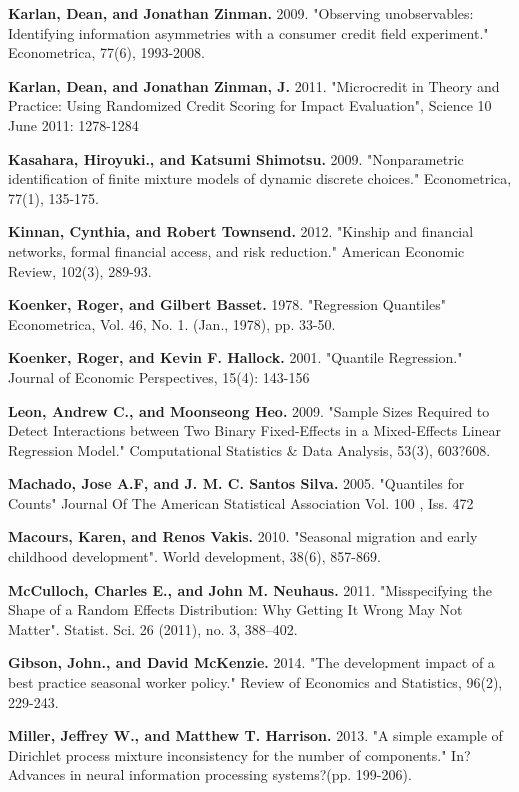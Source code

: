 \documentclass[AER]{AEA}
\begin{document}
\begin{thebibliography}{99}
 \textbf{ Karlan, Dean, and Jonathan Zinman.} 2009. "Observing unobservables: Identifying information asymmetries with a consumer credit field experiment." Econometrica, 77(6), 1993-2008.

  \textbf{ Karlan, Dean, and Jonathan Zinman, J.} 2011. "Microcredit in Theory and Practice: Using Randomized Credit Scoring for Impact Evaluation", Science 10 June 2011: 1278-1284
 
  \textbf{ Kasahara, Hiroyuki., and Katsumi Shimotsu.} 2009. "Nonparametric identification of finite mixture models of dynamic discrete choices." Econometrica, 77(1), 135-175.
 
 \textbf{ Kinnan, Cynthia, and Robert Townsend.} 2012. "Kinship and financial networks, formal financial access, and risk reduction." American Economic Review, 102(3), 289-93.

 \textbf{ Koenker, Roger, and Gilbert Basset.} 1978. "Regression Quantiles"  Econometrica, Vol. 46, No. 1. (Jan., 1978), pp. 33-50.

 \textbf{ Koenker, Roger, and Kevin F. Hallock.} 2001. "Quantile Regression." Journal of Economic Perspectives, 15(4): 143-156

 \textbf{ Leon, Andrew C., and Moonseong Heo.} 2009. "Sample Sizes Required to Detect Interactions between Two Binary Fixed-Effects in a Mixed-Effects Linear Regression Model." Computational Statistics \& Data Analysis, 53(3), 603?608.

 \textbf{ Machado, Jose A.F, and J. M. C. Santos Silva.} 2005. "Quantiles for Counts" Journal Of The American Statistical Association Vol. 100 , Iss. 472

 \textbf{ Macours, Karen, and Renos Vakis.} 2010. "Seasonal migration and early childhood development". World development, 38(6), 857-869.

 \textbf{ McCulloch, Charles E., and John M. Neuhaus.} 2011. "Misspecifying the Shape of a Random Effects Distribution: Why Getting It Wrong May Not Matter". Statist. Sci. 26 (2011), no. 3, 388--402.

 \textbf{ Gibson, John., and David McKenzie.} 2014. "The development impact of a best practice seasonal worker policy." Review of Economics and Statistics, 96(2), 229-243.

 \textbf{ Miller, Jeffrey W., and Matthew T. Harrison.} 2013. "A simple example of Dirichlet process mixture inconsistency for the number of components." In?Advances in neural information processing systems?(pp. 199-206).


\end{thebibliography}
\end{document}
